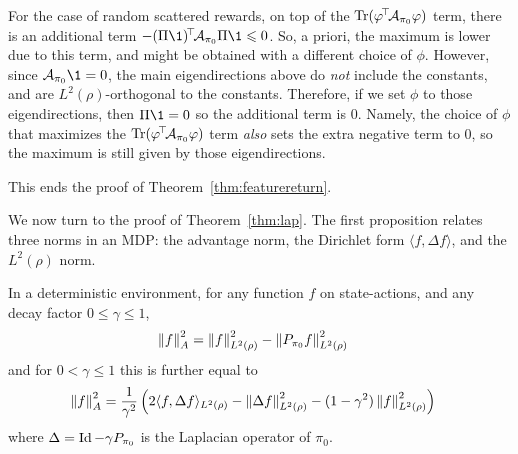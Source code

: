\documentclass[11pt,a4paper]{article}
\newcommand{\AK}{\mathcal{A}}
\begin{document}
\begin{dem}
For the case of random scattered rewards, on top of the
$\Tr(\transp{\phi}\AK_{\pi_0} \phi)$ term, there is an additional term
$-\transp{(\Pi\1)}\AK_{\pi_0}\Pi\1\leq 0$. So, a priori, the maximum is
lower due to this
term, and might be obtained with a different choice of $\phi$. However,
since $\AK_{\pi_0}\1=0$, the main eigendirections above
do \emph{not} include the constants, and are $L^2(\rho)$-orthogonal to
the constants. Therefore, if we set
$\phi$ to those eigendirections, then $\Pi\1=0$ so the additional term is
$0$. Namely, the choice of $\phi$ that maximizes the
$\Tr(\transp{\phi}\AK_{\pi_0}\phi)$ term \emph{also} sets the extra negative term to
$0$, so the maximum is still given by those eigendirections.

This ends the proof of Theorem~\ref{thm:featurereturn}.
\end{dem}

We now turn to the proof of Theorem~\ref{thm:lap}. The first proposition
relates three norms in an MDP: the advantage norm, the Dirichlet form
$\langle f,\Delta f\rangle$, and the $L^2(\rho)$ norm.

\begin{prop}
\label{prop:Anorm}
In a deterministic environment, for any function $f$ on state-actions,
and any decay factor $0\leq \gamma\leq 1$,
\begin{align}
\left\lVert f\right\rVert^2_A&=\left\lVert f\right\rVert^2_{L^2(\rho)}-\left\lVert P_{\pi_0} f\right\rVert^2_{L^2(\rho)}
\end{align}
and for $0<\gamma\leq 1$ this is further equal to
\begin{align}
\left\lVert f\right\rVert^2_A
&=\frac1{\gamma^2}\left(
2\langle f,\Delta f\rangle_{L^2(\rho)} -\left\lVert\Delta f\right\rVert^2_{L^2(\rho)}-(1-\gamma^2)
\left\lVert f\right\rVert^2_{L^2(\rho)}
\right)
\end{align}
where $\Delta=\operatorname{Id}-\gamma P_{\pi_0}$ is the Laplacian operator of $\pi_0$.
\end{prop}
\end{document}
